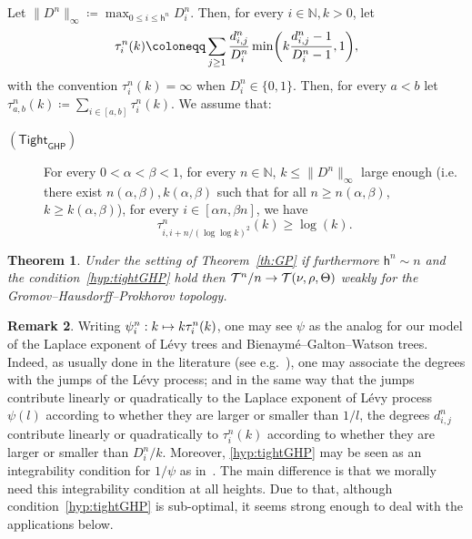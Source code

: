 \documentclass[10pt]{amsart}
\makeatletter
\newtheorem{theo}{Theorem}[section]
\theoremstyle{definition}\newtheorem{defi}[theo]{Definition}\newtheorem{rema}[theo]{Remark}\newtheorem{exam}[theo]{Example}\newtheorem{exem}[theo]{Example}\newtheorem{nota}[theo]{Notation}
\newcommand{\optionaldesc}[2]{
\phantomsection #1\protected@edef\@currentlabel{#1}\label{#2}
}
\newcommand{\N}{\mathbb{N}}
\newcommand{\1}{\mathbbm{1}}
\newcommand{\T}{\mathcal{T}}
\newcommand{\h}{\mathsf{h}}
\newcommand{\sTight}{\mathsf{Tight}}
\newcommand{\sGHP}{\mathsf{GHP}}
\let\originalleft\left
\let\originalright\right
\renewcommand{\left}{\mathopen{}\mathclose\bgroup\originalleft}
\renewcommand{\right}{\aftergroup\egroup\originalright}
\renewcommand*{\to}{\mathchoice{\longrightarrow}{\rightarrow}{\rightarrow}{\rightarrow}}
\let\oldmapsto\mapsto
\renewcommand*{\mapsto}{\mathchoice{\longmapsto}{\oldmapsto}{\oldmapsto}{\oldmapsto}}
\makeatother
\begin{document}
Let $\|D^n\|_\infty\coloneqq \max_{0\leq i\leq \h^n} D_i^n$.
Then, for every $i\in \N, k>0$, let
\begin{equation}\label{eq def tau}
\tau^n_{i}(k)\coloneqq\sum_{j\ge 1} \frac{d^n_{i,j}}{D^n_i} \min\left (k\frac{d^n_{i,j}-1}{D^n_i-1},1 \right),
\end{equation}
with the convention $\tau^n_i(k)=\infty$ when $D^n_i\in \{0,1\}$. Then, for every $a<b$ let $\tau^n_{a,b}(k)\coloneqq\sum_{i\in [a,b]}\tau^n_i(k)$. We assume that:
\smallskip
\begin{mdframed}[linecolor=black!60]
\begin{description}
\item[\textcolor{link}{\optionaldesc{$(\sTight_{\sGHP})$}{hyp:tightGHP}}] For every $0<\alpha<\beta<1$, for every $n\in \N$, $k\leq \|D^n\|_\infty$ large enough (i.e. there exist $n(\alpha, \beta), k(\alpha, \beta)$ such that for all $n\geq n(\alpha,\beta)$, $k\geq k(\alpha,\beta)$), for every $i\in [\alpha n,\beta n]$, we have
\[
\tau_{i,i+n/(\log \log k)^2}^n(k)\geq \log(k).
\]
\end{description}
\end{mdframed}


\begin{theo}\label{th:GHP}
Under the setting of Theorem~\ref{th:GP} if furthermore $\h^n\sim n$ and the condition~\ref{hyp:tightGHP} hold then
$\T^n/n\to \T(\nu,\rho,\Theta)$ weakly for the Gromov--Hausdorff--Prokhorov topology.
\end{theo}


\begin{rema}
Writing $\psi_i^n:k\mapsto k\tau_i^n(k)$, one may see $\psi$ as the analog for our model of the Laplace exponent of Lévy trees and Bienaymé--Galton--Watson trees. {Indeed, as usually done in the literature (see e.g.~\cite{DLG05}), one may associate the degrees with the jumps of the Lévy process; and in the same way that the jumps contribute linearly or quadratically to the Laplace exponent of Lévy process $\psi(l)$ according to whether they are larger or smaller than $1/l$, the degrees $d_{i,j}^n$ contribute linearly or quadratically to $\tau_i^n(k)$ according to whether they are larger or smaller than $D_i^n/k$.} Moreover, \ref{hyp:tightGHP} may be seen as an integrability condition for $1/\psi$ { as in~\cite[Eq.~(7)]{DLG05}}. The main difference is that we morally need this integrability condition at all heights. Due to that, although condition~\ref{hyp:tightGHP} is sub-optimal, it seems strong enough to deal with the applications below.
\end{rema}
\end{document}
